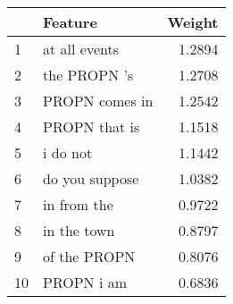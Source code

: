 \begin{tabular}{llr}
\toprule
{} &         Feature &  Weight \\
\midrule
1  &   at all events &  1.2894 \\
2  &    the PROPN 's &  1.2708 \\
3  &  PROPN comes in &  1.2542 \\
4  &   PROPN that is &  1.1518 \\
5  &        i do not &  1.1442 \\
6  &  do you suppose &  1.0382 \\
7  &     in from the &  0.9722 \\
8  &     in the town &  0.8797 \\
9  &    of the PROPN &  0.8076 \\
10 &      PROPN i am &  0.6836 \\
\bottomrule
\end{tabular}
